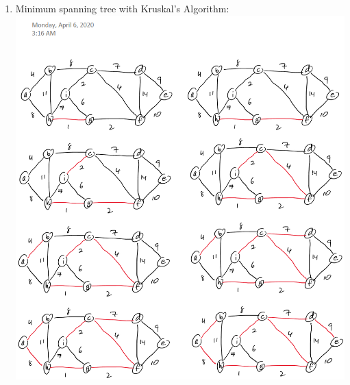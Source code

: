 \documentclass[11pt,fleqn]{article}
\begin{document}
\begin{enumerate}
\begin{enumerate}
		\item Minimum spanning tree with Kruskal’s Algorithm: \\
\includegraphics[scale=0.75]{Q9b}

\newpage


\end{enumerate}
\end{enumerate}
\end{document}
